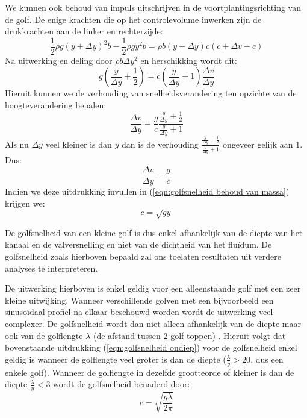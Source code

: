 We kunnen ook behoud van impuls uitschrijven in de voortplantingsrichting van de golf. De enige krachten die op het controlevolume inwerken zijn de drukkrachten aan de linker en rechterzijde:
\begin{equation}
	\frac{1}{2}\rho g (y+\Delta y)^2 b - \frac{1}{2}\rho g y^2 b = \rho b (y+\Delta y) c (c+\Delta v-c)
\end{equation}
Na uitwerking en deling door $\rho b \Delta y^2$ en herschikking wordt dit:
\begin{equation}
	 g \left(\frac{y}{\Delta y} + \frac{1}{2}\right)  = c \left(\frac{y}{\Delta y} + 1\right)\frac{\Delta v}{\Delta y}
\end{equation}
Hieruit kunnen we de verhouding van snelheidsverandering ten opzichte van de hoogteverandering bepalen:
\begin{equation}
	\frac{\Delta v}{\Delta y} = \frac{g}{c} \frac{\frac{y}{\Delta y} + \frac{1}{2}}{\frac{y}{\Delta y} + 1}
\end{equation}
Als nu $\Delta y$ veel kleiner is dan $y$ dan is de verhouding $\frac{\frac{y}{\Delta y} + \frac{1}{2}}{\frac{y}{\Delta y} + 1}$ ongeveer gelijk aan 1. Dus:
\begin{equation}
	\frac{\Delta v}{\Delta y} = \frac{g}{c}
\end{equation}
Indien we deze uitdrukking invullen in (\ref{eqn:golfsnelheid behoud van massa}) krijgen we:
\begin{equation}
	c = \sqrt{g y}
	\label{eqn:golfsnelheid ondiep}
\end{equation}

De golfsnelheid van een kleine golf is dus enkel afhankelijk van de diepte van het kanaal en de valversnelling en niet van de dichtheid van het fluïdum. De golfsnelheid zoals hierboven bepaald zal ons toelaten resultaten uit verdere analyses te interpreteren.

De uitwerking hierboven is enkel geldig voor een alleenstaande golf met een zeer kleine uitwijking. Wanneer verschillende golven met een bijvoorbeeld een sinusoïdaal profiel na elkaar beschouwd worden wordt de uitwerking veel complexer. De golfsnelheid wordt dan niet alleen afhankelijk van de diepte maar ook van de golflengte $\lambda$ (de afstand tussen 2 golf toppen) \cite{Henderson1966}. Hieruit volgt dat bovenstaande uitdrukking (\ref{eqn:golfsnelheid ondiep}) voor de golfsnelheid enkel geldig is wanneer de golflengte veel groter is dan de diepte ($\frac{\lambda}{y} > 20$, dus een enkele golf). Wanneer de golflengte in dezelfde grootteorde of kleiner is dan de diepte $\frac{\lambda}{y} < 3$ wordt de golfsnelheid benaderd door:
\begin{equation}
	c = \sqrt{\frac{g \lambda}{2\pi}}
	\label{eqn:golfsnelheid diep}
\end{equation}

